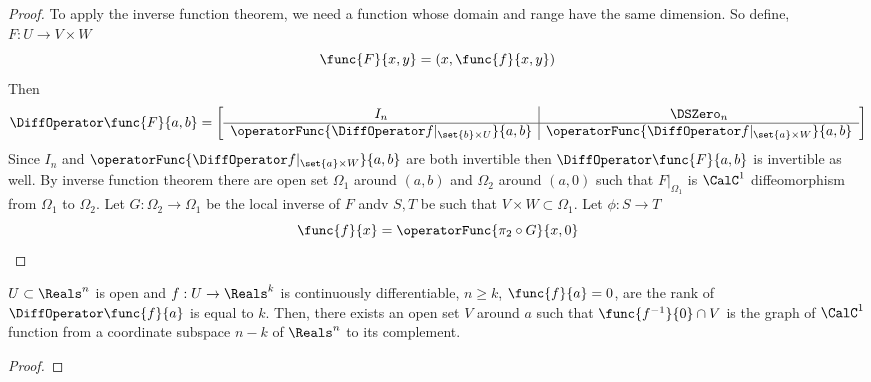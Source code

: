 \begin{proof}
    To apply the inverse function theorem, we need a function whose domain and range have the same dimension. So define, \(F: U \to V \times W\)
    \begin{equation*}
        \func{F}{x,y} = (x,\func{f}{x,y})
    \end{equation*}
    Then
    \begin{equation*}
        \DiffOperator \func{F}{a,b} = \left[\begin{array}{c|c}
                I_n                                                     & \DSZero_n                                               \\ \hline
                \operatorFunc{\DiffOperator f|_{\set{b} \times U}}{a,b} & \operatorFunc{\DiffOperator f|_{\set{a} \times W}}{a,b}
            \end{array}\right]
    \end{equation*}
    Since \(I_n\) and \(\operatorFunc{\DiffOperator f|_{\set{a} \times W}}{a,b}\) are both invertible then \(\DiffOperator \func{F}{a,b}\) is invertible as well. By inverse function theorem there are open set \(\Omega_1\) around \((a,b)\) and \(\Omega_2\) around \((a,0)\) such that \(F|_{\Omega_1}\) is \(\CalC^1\) diffeomorphism from \(\Omega_1\) to \(\Omega_2\). Let \(G: \Omega_2 \to \Omega_1\) be the local inverse of \(F\) andv \(S,T\) be such that \(V \times W \subset \Omega_1\). Let \(\phi : S \to T\)
    \begin{equation*}
        \func{f}{x} = \operatorFunc{ \pi_2 \circ G}{x,0}
    \end{equation*}
\end{proof}

\begin{corollary}
    \(U \subset \Reals^n\) is open and \(f : U \to \Reals^k\) is continuously differentiable, \(n \geq k\), \(\func{f}{a} = 0\), are the rank of \(\DiffOperator \func{f}{a}\) is equal to \(k\). Then, there exists an open set \(V\) around \(a\) such that \(\func{f^{-1}}{0} \cap V\) is the graph of \(\CalC^1\) function from a coordinate subspace \(n - k\) of \(\Reals^n\) to its complement.
\end{corollary}

\begin{proof}

\end{proof}



